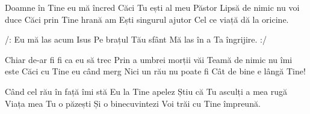 
\beginverse
Doamne în Tine eu mă încred
Căci Tu ești al meu Păstor
Lipsă de nimic nu voi duce
Căci prin Tine hrană am
Ești singurul ajutor
Cel ce viață dă la oricine.
\endverse

\beginchorus
/: Eu mă las acum Isus
Pe brațul Tău sfânt
Mă las în a Ta îngrijire. :/
\endchorus

\beginverse
Chiar de-ar fi fi ca eu să trec
Prin a umbrei morții văi
Teamă de nimic nu îmi este
Căci cu Tine eu când merg
Nici un rău nu poate fi
Cât de bine e lângă Tine!
\endverse

\beginverse
Când cel rău în față îmi stă
Eu la Tine apelez
Știu că Tu asculți a mea rugă
Viața mea Tu o păzești
Și o binecuvintezi
Voi trăi cu Tine împreună.
\endverse

\endsong
